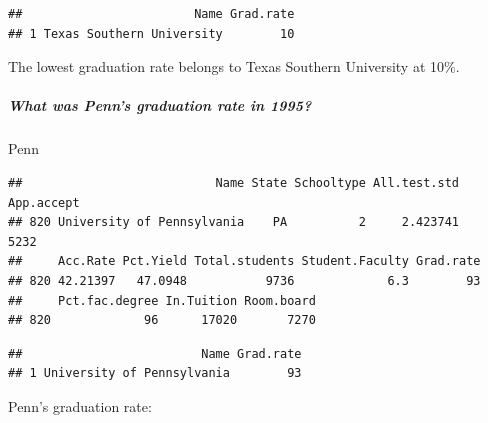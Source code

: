 \documentclass[]{article}
\newenvironment{Shaded}{\begin{snugshade}}{\end{snugshade}}
\newcommand{\KeywordTok}[1]{\textcolor[rgb]{0.13,0.29,0.53}{\textbf{#1}}}
\newcommand{\StringTok}[1]{\textcolor[rgb]{0.31,0.60,0.02}{#1}}
\newcommand{\CommentTok}[1]{\textcolor[rgb]{0.56,0.35,0.01}{\textit{#1}}}
\newcommand{\OperatorTok}[1]{\textcolor[rgb]{0.81,0.36,0.00}{\textbf{#1}}}
\newcommand{\NormalTok}[1]{#1}
\let\oldsubparagraph\subparagraph
\renewcommand{\subparagraph}[1]{\oldsubparagraph{#1}\mbox{}}
\begin{document}
\begin{verbatim}
##                        Name Grad.rate
## 1 Texas Southern University        10
\end{verbatim}

The lowest graduation rate belongs to Texas Southern University at 10\%.

\subparagraph{What was Penn's graduation rate in
1995?}\label{what-was-penns-graduation-rate-in-1995}

\begin{Shaded}
\begin{Highlighting}[]
\NormalTok{Penn}
\end{Highlighting}
\end{Shaded}

\begin{verbatim}
##                           Name State Schooltype All.test.std App.accept
## 820 University of Pennsylvania    PA          2     2.423741       5232
##     Acc.Rate Pct.Yield Total.students Student.Faculty Grad.rate
## 820 42.21397   47.0948           9736             6.3        93
##     Pct.fac.degree In.Tuition Room.board
## 820             96      17020       7270
\end{verbatim}

\begin{Shaded}
\end{Shaded}

\begin{verbatim}
##                         Name Grad.rate
## 1 University of Pennsylvania        93
\end{verbatim}

\begin{Shaded}
\end{Shaded}

Penn's graduation rate:

\begin{Shaded}
\end{Shaded}
\end{document}
